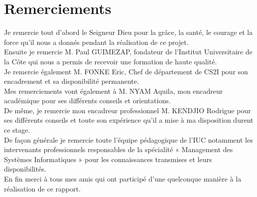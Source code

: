 \chapter{Remerciements}

Je remercie tout d’abord le Seigneur Dieu pour la grâce, la santé, le courage et la force qu’il nous a donnés pendant la réalisation de ce projet.\\

Ensuite je remercie M. Paul GUIMEZAP, fondateur de l’Institut Universitaire de la Côte qui nous a permis de recevoir une formation de haute qualité.\\

Je remercie également M. FONKE Eric, Chef de département de CS2I pour son encadrement et sa disponibilité permanente.\\

Mes remerciements vont également à M. NYAM Aquila, mon encadreur académique pour ses différents conseils et orientations.\\

De même, je remercie mon encadreur professionnel M. KENDJIO Rodrigue pour ses différents conseils et toute son expérience qu’il a mise à ma disposition durent ce stage.\\

De façon générale je remercie toute l’équipe pédagogique de l’IUC notamment les intervenants professionnels responsables de la spécialité « Management des Systèmes Informatiques » pour les connaissances transmises et leurs disponibilités.\\

En fin merci à tous mes amis qui ont participé d’une quelconque manière à la réalisation de ce rapport. 
